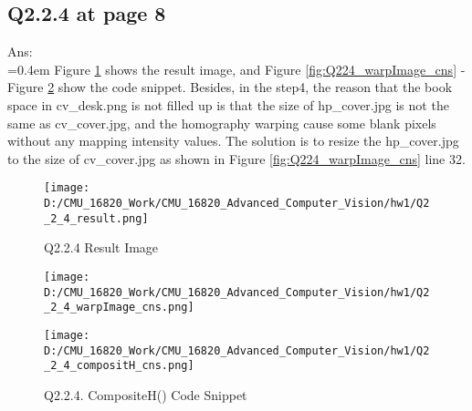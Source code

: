 \documentclass{article}
\begin{document}
	\newpage
	\subsection*{Q2.2.4 at page 8}
	Ans:\\
	\hangindent=0.4em \hspace{0.3em} Figure \ref{fig:Q224_result} shows the result image, and Figure \ref{fig:Q224_warpImage_cns} - Figure \ref{fig:Q224_compositeH_cns} show the code snippet. Besides, in the step4, the reason that the book space in cv\_desk.png is not filled up is that the size of hp\_cover.jpg is not the same as cv\_cover.jpg, and the homography warping cause some blank pixels without any mapping intensity values.
	The solution is to resize the hp\_cover.jpg to the size of cv\_cover.jpg as shown in Figure \ref{fig:Q224_warpImage_cns} line 32.
	\begin{figure}[H]		
	\centering
	\texttt{[image: D:/CMU\_16820\_Work/CMU\_16820\_Advanced\_Computer\_Vision/hw1/Q2\_2\_4\_result.png]}  %
	\caption{Q2.2.4 Result Image}
	\label{fig:Q224_result}
	\end{figure}	
	\begin{figure}[H]
	\centering
	\begin{minipage}[b]{0.45\textwidth}
		\centering
		\texttt{[image: D:/CMU\_16820\_Work/CMU\_16820\_Advanced\_Computer\_Vision/hw1/Q2\_2\_4\_warpImage\_cns.png]}  %
		\caption{Q2.2.4 warpImage() Code Snippet}
		\label{fig:Q224_warpImage_cns}
	\end{minipage}
	\hfill  %
	\begin{minipage}[b]{0.45\textwidth}
		\centering
		\texttt{[image: D:/CMU\_16820\_Work/CMU\_16820\_Advanced\_Computer\_Vision/hw1/Q2\_2\_4\_compositH\_cns.png]}  %
		\caption{Q2.2.4. CompositeH() Code Snippet}
		\label{fig:Q224_compositeH_cns}
	\end{minipage}	
	\end{figure}	
	
	\newpage
\end{document}
